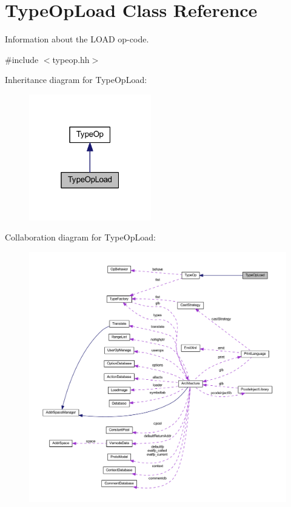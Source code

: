 \hypertarget{class_type_op_load}{}\section{Type\+Op\+Load Class Reference}
\label{class_type_op_load}


Information about the L\+O\+AD op-\/code.  




{\ttfamily \#include $<$typeop.\+hh$>$}



Inheritance diagram for Type\+Op\+Load\+:
\nopagebreak
\begin{figure}[H]
\begin{center}
\leavevmode
\includegraphics[width=151pt]{class_type_op_load__inherit__graph}
\end{center}
\end{figure}


Collaboration diagram for Type\+Op\+Load\+:
\nopagebreak
\begin{figure}[H]
\begin{center}
\leavevmode
\includegraphics[width=350pt]{class_type_op_load__coll__graph}
\end{center}
\end{figure}
